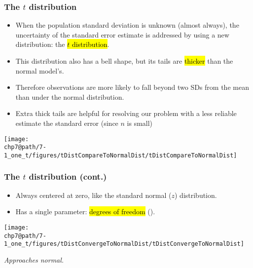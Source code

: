 \documentclass[slidestop,compress,mathserif]{beamer}
\makeatletter
\newcommand{\soln}[1]{\textit{#1}}
\def\chp7@path{../../Chp 7}
\makeatother
\begin{document}
\begin{frame}
\frametitle{The $t$ distribution}

\begin{itemize}

\item When the population standard deviation is unknown (almost always), the uncertainty of the standard error estimate is addressed by using a new distribution: the \hl{$t$ distribution}.

\pause

\item This distribution also has a bell shape, but its tails are \hl{thicker} than the normal model's.

\pause

\item Therefore observations are more likely to fall beyond two SDs from the mean than under the normal distribution.

\pause

\item Extra thick tails are helpful for resolving our problem with a less reliable estimate the standard error (since $n$ is small)

\end{itemize}

\begin{center}
\texttt{[image: \\chp7@path/7-1\_one\_t/figures/tDistCompareToNormalDist/tDistCompareToNormalDist]}
\end{center}

\end{frame}


\begin{frame}
\frametitle{The $t$ distribution (cont.)}

\begin{itemize}

\item Always centered at zero, like the standard normal ($z$) distribution.

\item Has a single parameter: \hl{degrees of freedom} ().

\end{itemize}

\begin{center}
\texttt{[image: \\chp7@path/7-1\_one\_t/figures/tDistConvergeToNormalDist/tDistConvergeToNormalDist]}
\end{center}

\pause


\soln{\pause Approaches normal.}

\end{frame}
\end{document}

